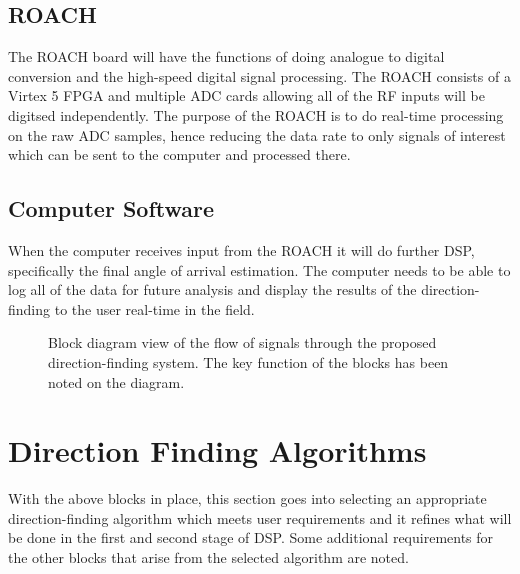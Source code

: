\subsection{ROACH}
The ROACH board will have the functions of doing analogue to digital conversion and the high-speed digital signal processing. The ROACH consists of a Virtex 5 FPGA and multiple ADC cards allowing all of the RF inputs will be digitsed independently. The purpose of the ROACH is to do real-time processing on the raw ADC samples, hence reducing the data rate to only signals of interest which can be sent to the computer and processed there.

\subsection{Computer Software}
When the computer receives input from the ROACH it will do further DSP, specifically the final angle of arrival estimation. The computer needs to be able to log all of the data for future analysis and display the results of the direction-finding to the user real-time in the field.


\begin{landscape}
  \thispagestyle{empty}
  \begin{figure}
    \centering
  \caption{Block diagram view of the flow of signals through the proposed direction-finding system. The key function of the blocks has been noted on the diagram. }
  \label{fig:system-design:signal-flow}
  \end{figure}
\end{landscape}

\section{Direction Finding Algorithms}
With the above blocks in place, this section goes into selecting an appropriate direction-finding algorithm which meets user requirements and it refines what will be done in the first and second stage of DSP. Some additional requirements for the other blocks that arise from the selected algorithm are noted. 

